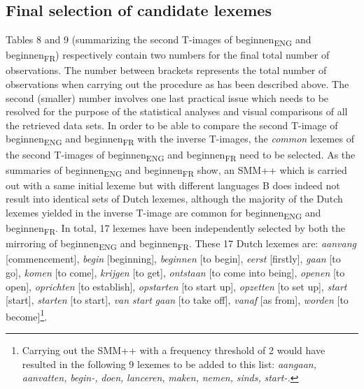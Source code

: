 \subsection{Final selection of candidate lexemes}
\label{sec:3.6.4}  
Tables 8 and 9 (summarizing the second T-images of beginnen\textsubscript{ENG} and beginnen\textsubscript{FR}) respectively contain two numbers for the final total number of observations. The number between brackets represents the total number of observations when carrying out the procedure as has been described above. The second (smaller) number involves one last practical issue which needs to be resolved for the purpose of the statistical analyses and visual comparisons of all the retrieved data sets. In order to be able to compare the second T-image of beginnen\textsubscript{ENG} and beginnen\textsubscript{FR} with the inverse T-images, the \textit{common} lexemes of the second T-images of beginnen\textsubscript{ENG} and beginnen\textsubscript{FR} need to be selected. As the summaries of beginnen\textsubscript{ENG} and beginnen\textsubscript{FR} show, an SMM++ which is carried out with a same initial lexeme but with different languages B does indeed not result into identical sets of Dutch lexemes, although the majority of the Dutch lexemes yielded in the inverse T-image are common for beginnen\textsubscript{ENG} and beginnen\textsubscript{FR}. In total, 17 lexemes have been independently selected by both the mirroring of beginnen\textsubscript{ENG} and beginnen\textsubscript{FR}. These 17 Dutch lexemes are: \textit{aanvang} [commencement], \textit{begin} [beginning], \textit{beginnen} [to begin], \textit{eerst} [firstly], \textit{gaan} [to go], \textit{komen} [to come], \textit{krijgen} [to get], \textit{ontstaan} [to come into being], \textit{openen} [to open], \textit{oprichten} [to establish], \textit{opstarten} [to start up], \textit{opzetten} [to set up], \textit{start} [start], \textit{starten} [to start], \textit{van} \textit{start} \textit{gaan} [to take off], \textit{vanaf} [as from], \textit{worden} [to become]\footnote{Carrying out the SMM++ with a frequency threshold of 2 would have resulted in the following 9 lexemes to be added to this list: \textit{aangaan,} \textit{aanvatten,} \textit{begin-,} \textit{doen,} \textit{lanceren,} \textit{maken,} \textit{nemen,} \textit{sinds,} \textit{start-.}}.

